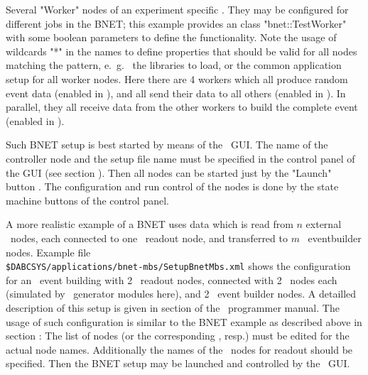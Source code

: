 \item Several "Worker" nodes of an experiment specific . They
may be configured for different jobs in the BNET; this example provides
an  class "bnet::TestWorker" with some boolean parameters
to define the functionality.
\ebul 
Note the usage of wildcards "*" in the  names to define
properties that should be valid for all nodes matching the pattern, e.~g.~
the libraries to load, or the common application setup for all worker nodes.
Here there are 4 workers which all produce random event data (enabled in ),
and all send their data to all others (enabled in ). In parallel,
they all receive data from the other workers to build the complete event
(enabled in ).

Such BNET setup is best started by means of the \dabc\ GUI.
The name of the controller  node and
the setup file name must be specified in the control panel of the GUI
(see section ). Then all nodes can be started just by the
"Launch" button . The configuration and run control of the nodes is done by the state machine buttons of the control panel.


A more realistic example of a BNET uses data which is read from $n$ external \mbs\ 
nodes, each connected to one \dabc\ readout node, and transferred to
$m$ \dabc\ eventbuilder nodes.
Example file \\
{\tt \$DABCSYS/applications/bnet-mbs/SetupBnetMbs.xml}
shows the configuration for an \mbs\  event building with 2 \dabc\ readout nodes, connected with 2 \mbs\ nodes each (simulated by \dabc\ generator modules here),
and 2 \dabc\ event builder nodes. A detailled description
of this setup is given in section  of the \dabc\
programmer manual.
The usage of such configuration is similar to the BNET example as
described above in section :
The list of \keyw{<Context>} nodes (or the
corresponding \keyw{<Variables>}, resp.) 
must be edited for the actual node names. Additionally the names of the
\mbs\ nodes for readout should be specified. Then the BNET
setup may be launched and controlled by the \dabc\ GUI.
